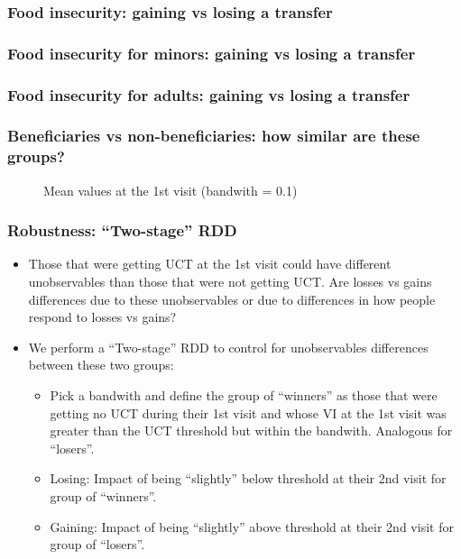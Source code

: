 \documentclass{beamer}
\begin{document}
\begin{frame}
\frametitle{Food insecurity: gaining vs losing a transfer}
\begin{figure}
	
\end{figure}
\end{frame}

\begin{frame}
\frametitle{Food insecurity for minors: gaining vs losing a transfer}
\begin{figure}

\end{figure}
\end{frame}

\begin{frame}
\frametitle{Food insecurity for adults: gaining vs losing a transfer}
\begin{figure}
	
\end{figure}
\end{frame}

\begin{frame}
\frametitle{Beneficiaries vs non-beneficiaries: how similar are these groups?}
\begin{figure}
	\caption{Mean values at the 1st visit (bandwith = 0.1)}
	
\end{figure}
\end{frame}

\begin{frame}
\frametitle{Robustness: ``Two-stage'' RDD}
\begin{itemize}
	\item Those that were getting UCT at the 1st visit could have different unobservables than those that were not getting UCT. Are losses vs gains differences due to these unobservables or due to differences in how people respond to losses vs gains?
	\item We perform a ``Two-stage'' RDD to control for unobservables differences between these two groups:
	\begin{itemize}
		\item Pick a bandwith and define the group of ``winners'' as those that were getting no UCT during their 1st visit and whose VI at the 1st visit was greater than the UCT threshold but within the bandwith. Analogous for ``losers''.
		\item Losing: Impact of being ``slightly'' below threshold at their 2nd visit for group of ``winners''.
		\item Gaining: Impact of being ``slightly'' above threshold at their 2nd visit for group of ``losers''.   
	\end{itemize}
\end{itemize}
\end{frame}
\end{document}
